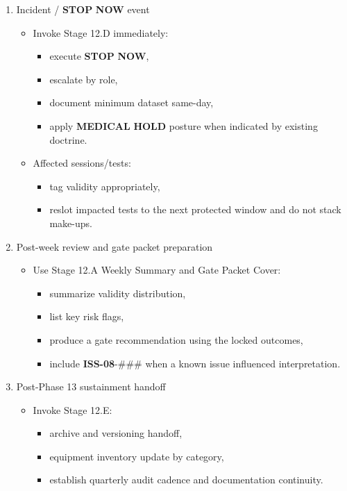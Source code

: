 \documentclass[10pt]{article}
\begin{document}
\begin{enumerate}
\item Incident / \textbf{STOP} \textbf{NOW} event
  \begin{itemize}
  \item Invoke Stage 12.D immediately:
    \begin{itemize}
    \item execute \textbf{STOP} \textbf{NOW},
    \item escalate by role,
    \item document minimum dataset same-day,
    \item apply \textbf{MEDICAL} \textbf{HOLD} posture when indicated by existing doctrine.
    \end{itemize}
  \item Affected sessions/tests:
    \begin{itemize}
    \item tag validity appropriately,
    \item reslot impacted tests to the next protected window and do not stack make-ups.
    \end{itemize}
  \end{itemize}

\item Post-week review and gate packet preparation
  \begin{itemize}
  \item Use Stage 12.A Weekly Summary and Gate Packet Cover:
    \begin{itemize}
    \item summarize validity distribution,
    \item list key risk flags,
    \item produce a gate recommendation using the locked outcomes,
    \item include \textbf{ISS-08}-\#\#\# when a known issue influenced interpretation.
    \end{itemize}
  \end{itemize}

\item Post-Phase 13 sustainment handoff
  \begin{itemize}
  \item Invoke Stage 12.E:
    \begin{itemize}
    \item archive and versioning handoff,
    \item equipment inventory update by category,
    \item establish quarterly audit cadence and documentation continuity.
    \end{itemize}
  \end{itemize}
\end{enumerate}
\end{document}
